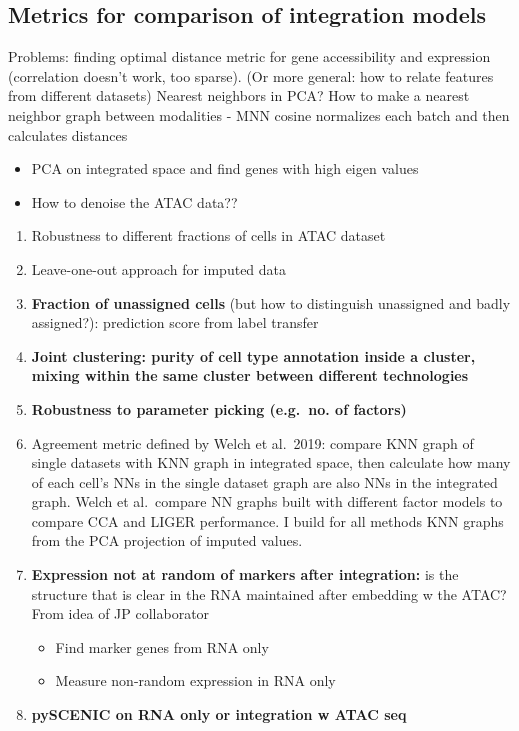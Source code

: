 \documentclass[]{article}
\providecommand{\tightlist}{%
  \setlength{\itemsep}{0pt}\setlength{\parskip}{0pt}}
\begin{document}
\hypertarget{metrics-for-comparison-of-integration-models}{%
\subsection{Metrics for comparison of integration
models}\label{metrics-for-comparison-of-integration-models}}

Problems: finding optimal distance metric for gene accessibility and
expression (correlation doesn't work, too sparse). (Or more general: how
to relate features from different datasets) Nearest neighbors in PCA?
How to make a nearest neighbor graph between modalities - MNN cosine
normalizes each batch and then calculates distances

\begin{itemize}
\tightlist
\item
  PCA on integrated space and find genes with high eigen values
\item
  How to denoise the ATAC data??
\end{itemize}

\begin{enumerate}
\def\labelenumi{\arabic{enumi})}
\setcounter{enumi}{1}
\tightlist
\item
  Robustness to different fractions of cells in ATAC dataset
\item
  Leave-one-out approach for imputed data
\item
  \textbf{Fraction of unassigned cells} (but how to distinguish
  unassigned and badly assigned?): prediction score from label transfer
\item
  \textbf{Joint clustering: purity of cell type annotation inside a
  cluster, mixing within the same cluster between different
  technologies}
\item
  \textbf{Robustness to parameter picking (e.g.~no. of factors)}
\item
  Agreement metric defined by Welch et al.~2019: compare KNN graph of
  single datasets with KNN graph in integrated space, then calculate how
  many of each cell's NNs in the single dataset graph are also NNs in
  the integrated graph. Welch et al.~compare NN graphs built with
  different factor models to compare CCA and LIGER performance. I build
  for all methods KNN graphs from the PCA projection of imputed values.
\item
  \textbf{Expression not at random of markers after integration:} is the
  structure that is clear in the RNA maintained after embedding w the
  ATAC? From idea of JP collaborator

  \begin{itemize}
  \tightlist
  \item
    Find marker genes from RNA only
  \item
    Measure non-random expression in RNA only
  \end{itemize}
\item
  \textbf{pySCENIC on RNA only or integration w ATAC seq}
\end{enumerate}
\end{document}
